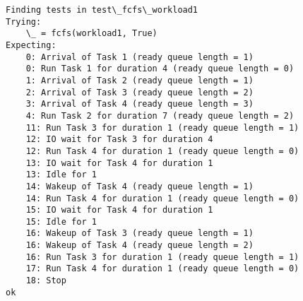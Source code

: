 \documentclass[11pt]{article}
\begin{document}
    \begin{Verbatim}[commandchars=\\\{\}]
Finding tests in test\_fcfs\_workload1
Trying:
    \_ = fcfs(workload1, True)
Expecting:
    0: Arrival of Task 1 (ready queue length = 1)
    0: Run Task 1 for duration 4 (ready queue length = 0)
    1: Arrival of Task 2 (ready queue length = 1)
    2: Arrival of Task 3 (ready queue length = 2)
    3: Arrival of Task 4 (ready queue length = 3)
    4: Run Task 2 for duration 7 (ready queue length = 2)
    11: Run Task 3 for duration 1 (ready queue length = 1)
    12: IO wait for Task 3 for duration 4
    12: Run Task 4 for duration 1 (ready queue length = 0)
    13: IO wait for Task 4 for duration 1
    13: Idle for 1
    14: Wakeup of Task 4 (ready queue length = 1)
    14: Run Task 4 for duration 1 (ready queue length = 0)
    15: IO wait for Task 4 for duration 1
    15: Idle for 1
    16: Wakeup of Task 3 (ready queue length = 1)
    16: Wakeup of Task 4 (ready queue length = 2)
    16: Run Task 3 for duration 1 (ready queue length = 1)
    17: Run Task 4 for duration 1 (ready queue length = 0)
    18: Stop
ok

    \end{Verbatim}
\end{document}
